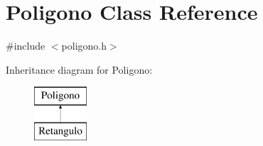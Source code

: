 \hypertarget{class_poligono}{}\section{Poligono Class Reference}
\label{class_poligono}


{\ttfamily \#include $<$poligono.\+h$>$}

Inheritance diagram for Poligono\+:\begin{figure}[H]
\begin{center}
\leavevmode
\includegraphics[height=2.000000cm]{class_poligono}
\end{center}
\end{figure}
